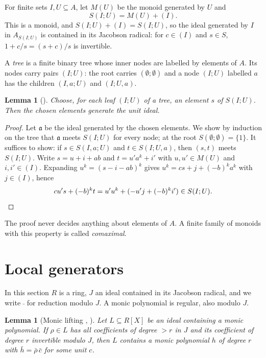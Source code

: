 \documentclass[11pt]{amsart}
\newtheorem{lemma}[theorem]{Lemma}
\theoremstyle{remark}
\begin{document}
For finite sets $I,U\subseteq A$, let $M(U)$ be the monoid generated by $U$ and
\[
S(I;U) = M(U) + (I).
\]
This is a monoid, and $S(I;U)+(I)=S(I;U)$, so the ideal generated by $I$ in
$A_{S(I;U)}$ is contained in its Jacobson radical: for $c\in(I)$ and $s\in S$,
$1+c/s=(s+c)/s$ is invertible.

A \emph{tree} is a finite binary tree whose inner nodes are labelled by elements
of $A$. Its nodes carry pairs $(I;U)$: the root carries $(\emptyset;\emptyset)$
and a node $(I;U)$ labelled $a$ has the children $(I,a;U)$ and $(I;U,a)$.

\begin{lemma}[{\cite[Chapter XV]{LQ15}}]\label{lem:comax}
Choose, for each leaf $(I;U)$ of a tree, an element $s$ of $S(I;U)$. Then the
chosen elements generate the unit ideal.
\end{lemma}

\begin{proof}
Let $\mathfrak a$ be the ideal generated by the chosen elements. We show by
induction on the tree that $\mathfrak a$ meets $S(I;U)$ for every node; at the
root $S(\emptyset;\emptyset)=\{1\}$. It suffices to show: if $s\in S(I,a;U)$ and
$t\in S(I;U,a)$, then $(s,t)$ meets $S(I;U)$. Write $s=u+i+ab$ and
$t=u'a^k+i'$ with $u,u'\in M(U)$ and $i,i'\in(I)$. Expanding
$u^k=(s-i-ab)^k$ gives $u^k=cs+j+(-b)^ka^k$ with $j\in(I)$, hence
\[
cu's+(-b)^kt = u'u^k + (-u'j + (-b)^ki') \in S(I;U).\qedhere
\]
\end{proof}

The proof never decides anything about elements of $A$. A finite family of
monoids with this property is called \emph{comaximal}.

\section{Local generators}

In this section $R$ is a ring, $J$ an ideal contained in its Jacobson radical,
and we write $\bar{\ }$ for reduction modulo $J$. A monic polynomial is regular,
also modulo $J$.

\begin{lemma}[Monic lifting {\cite[IV.5.1]{Lam06}, \cite[Lemma 7.5]{Proj}}]\label{lem:lift}
Let $L\subseteq R[X]$ be an ideal containing a monic polynomial. If
$\rho\in L$ has all coefficients of degree $>r$ in $J$ and its coefficient of
degree $r$ invertible modulo $J$, then $L$ contains a monic polynomial $h$ of
degree $r$ with $\bar h=\bar\rho\,\bar c$ for some unit $c$.
\end{lemma}
\end{document}
